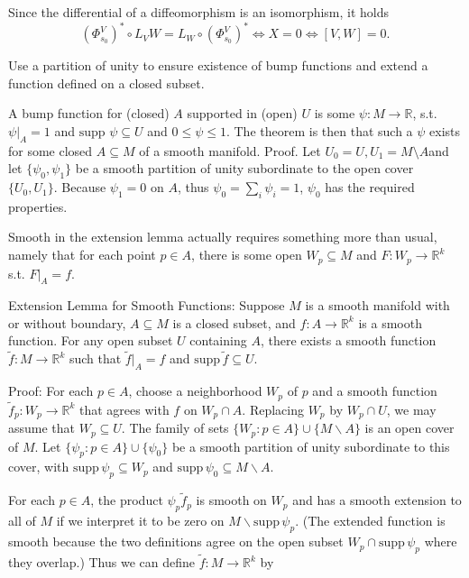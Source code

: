 Since the differential of a diffeomorphism is an isomorphism, it holds
\[
(\Phi^V_{s_0})^* \circ L_V W = L_W \circ (\Phi^V_{s_0})^* \iff X = 0 \iff [V, W] = 0.
\]

Use a partition of unity to ensure existence of bump functions and extend a function defined on a closed subset.

A bump function for (closed) \( A \) supported in (open) \( U \) is some \( \psi : M \to \mathbb{R} \), s.t. \( \psi|_A = 1 \)
and \( \text{supp }\psi \subseteq U \) and \(0 \leq \psi \leq 1 \).
The theorem is then that such a \( \psi \) exists for some closed \( A \subseteq M \) of a smooth manifold.
Proof.
Let \( U_0 = U, U_1 = M \setminus A \)and let \( \{\psi_0, \psi_1\} \) be a smooth partition of
unity subordinate to the open cover \( \{U_0, U_1\} \). Because \( \psi_1 = 0 \) on \( A \), thus \( \psi_0 = \sum_i \psi_i = 1 \),
\( \psi_0 \) has the required properties.



Smooth in the extension lemma actually requires something more than usual, namely
that for each point \( p \in A \), there is some open \( W_p \subseteq M \)
and \( F : W_p \to \mathbb{R}^k \) s.t. \( F|_A = f \).

Extension Lemma for Smooth Functions:
Suppose \(M\) is a smooth manifold with or without boundary, \(A \subseteq M\) is a closed subset, and \(f : A \rightarrow \mathbb{R}^k\) is a smooth function. 
For any open subset \(U\) containing \(A\), there exists a smooth function \(\tilde{f} : M \rightarrow \mathbb{R}^k\) such that \(\tilde{f}|_A = f\) and \(\text{supp} \, \tilde{f} \subseteq U\).

Proof: 
For each \(p \in A\), choose a neighborhood \(W_p\) of \(p\) and a smooth function \(\tilde{f}_p : W_p \rightarrow \mathbb{R}^k\) that agrees with \(f\) on \(W_p \cap A\). 
Replacing \(W_p\) by \(W_p \cap U\), we may assume that \(W_p \subseteq U\). The family of sets \(\{W_p : p \in A\} \cup \{M \backslash A\}\) is an open cover of \(M\). 
Let \(\{\psi_p : p \in A\} \cup \{\psi_0\}\) be a smooth partition of unity subordinate to this cover, 
with \(\text{supp} \, \psi_p \subseteq W_p\) and \(\text{supp} \, \psi_0 \subseteq M \backslash A\).

For each \(p \in A\), the product \(\psi_p \tilde{f}_p\) is smooth on \(W_p\) and has a smooth extension to all of \(M\) if we interpret it to be zero on \(M \backslash \text{supp} \, \psi_p\). 
(The extended function is smooth because the two definitions agree on the open subset \(W_p \cap \text{supp} \, \psi_p\) where they overlap.) 
Thus we can define \(\tilde{f} : M \rightarrow \mathbb{R}^k\) by

